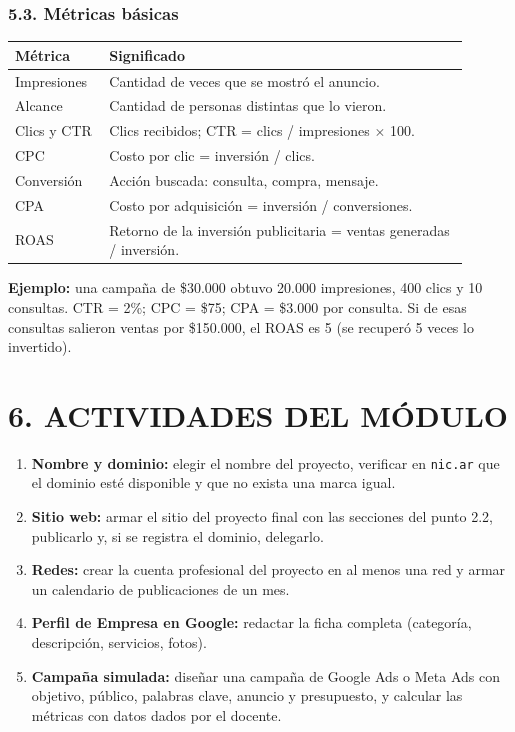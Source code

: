 \subsubsection*{5.3. Métricas básicas}
\begin{center}
\small
\begin{tabular}{|p{0.18\linewidth}|p{0.72\linewidth}|}
\hline
\textbf{Métrica} & \textbf{Significado} \\ \hline
Impresiones & Cantidad de veces que se mostró el anuncio. \\ \hline
Alcance & Cantidad de personas distintas que lo vieron. \\ \hline
Clics y CTR & Clics recibidos; CTR = clics / impresiones $\times$ 100. \\ \hline
CPC & Costo por clic = inversión / clics. \\ \hline
Conversión & Acción buscada: consulta, compra, mensaje. \\ \hline
CPA & Costo por adquisición = inversión / conversiones. \\ \hline
ROAS & Retorno de la inversión publicitaria = ventas generadas / inversión. \\ \hline
\end{tabular}
\end{center}

\begin{recuadro}
\textbf{Ejemplo:} una campaña de \$30.000 obtuvo 20.000 impresiones, 400 clics y 10
consultas. CTR = 2\%; CPC = \$75; CPA = \$3.000 por consulta. Si de esas consultas salieron
ventas por \$150.000, el ROAS es 5 (se recuperó 5 veces lo invertido).
\end{recuadro}

\section*{6. ACTIVIDADES DEL MÓDULO}

\begin{enumerate}
  \item \textbf{Nombre y dominio:} elegir el nombre del proyecto, verificar en \texttt{nic.ar}
        que el dominio esté disponible y que no exista una marca igual.
  \item \textbf{Sitio web:} armar el sitio del proyecto final con las secciones del punto 2.2,
        publicarlo y, si se registra el dominio, delegarlo.
  \item \textbf{Redes:} crear la cuenta profesional del proyecto en al menos una red y armar un
        calendario de publicaciones de un mes.
  \item \textbf{Perfil de Empresa en Google:} redactar la ficha completa (categoría,
        descripción, servicios, fotos).
  \item \textbf{Campaña simulada:} diseñar una campaña de Google Ads o Meta Ads con objetivo,
        público, palabras clave, anuncio y presupuesto, y calcular las métricas con datos
        dados por el docente.
\end{enumerate}
